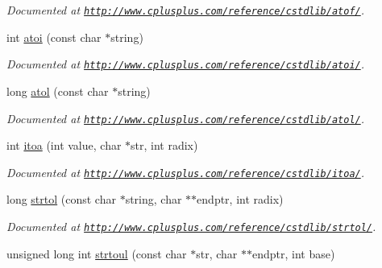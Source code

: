 \begin{DoxyCompactItemize}
\begin{DoxyCompactList}\small\item\em Documented at \href{http://www.cplusplus.com/reference/cstdlib/atof/}{\tt http\-://www.\-cplusplus.\-com/reference/cstdlib/atof/}. \end{DoxyCompactList}\item 
\hypertarget{group__string_gac5aa18897f547ff20f10c777c6a58f0a}{int \hyperlink{group__string_gac5aa18897f547ff20f10c777c6a58f0a}{atoi} (const char $\ast$string)}\label{group__string_gac5aa18897f547ff20f10c777c6a58f0a}

\begin{DoxyCompactList}\small\item\em Documented at \href{http://www.cplusplus.com/reference/cstdlib/atoi/}{\tt http\-://www.\-cplusplus.\-com/reference/cstdlib/atoi/}. \end{DoxyCompactList}\item 
\hypertarget{group__string_ga41345248d4ac38a48238dbd288332180}{long \hyperlink{group__string_ga41345248d4ac38a48238dbd288332180}{atol} (const char $\ast$string)}\label{group__string_ga41345248d4ac38a48238dbd288332180}

\begin{DoxyCompactList}\small\item\em Documented at \href{http://www.cplusplus.com/reference/cstdlib/atol/}{\tt http\-://www.\-cplusplus.\-com/reference/cstdlib/atol/}. \end{DoxyCompactList}\item 
\hypertarget{group__string_ga3e686aed704cb7a136cd69dc1f214368}{int \hyperlink{group__string_ga3e686aed704cb7a136cd69dc1f214368}{itoa} (int value, char $\ast$str, int radix)}\label{group__string_ga3e686aed704cb7a136cd69dc1f214368}

\begin{DoxyCompactList}\small\item\em Documented at \href{http://www.cplusplus.com/reference/cstdlib/itoa/}{\tt http\-://www.\-cplusplus.\-com/reference/cstdlib/itoa/}. \end{DoxyCompactList}\item 
\hypertarget{group__string_gaf7662e0df4f2b9a0abd9276eccc9f6aa}{long \hyperlink{group__string_gaf7662e0df4f2b9a0abd9276eccc9f6aa}{strtol} (const char $\ast$string, char $\ast$$\ast$endptr, int radix)}\label{group__string_gaf7662e0df4f2b9a0abd9276eccc9f6aa}

\begin{DoxyCompactList}\small\item\em Documented at \href{http://www.cplusplus.com/reference/cstdlib/strtol/}{\tt http\-://www.\-cplusplus.\-com/reference/cstdlib/strtol/}. \end{DoxyCompactList}\item 
\hypertarget{group__string_gaa7d767d03ce3929978c28f64e3a4b222}{unsigned long int \hyperlink{group__string_gaa7d767d03ce3929978c28f64e3a4b222}{strtoul} (const char $\ast$str, char $\ast$$\ast$endptr, int base)}\label{group__string_gaa7d767d03ce3929978c28f64e3a4b222}


\end{DoxyCompactItemize}
